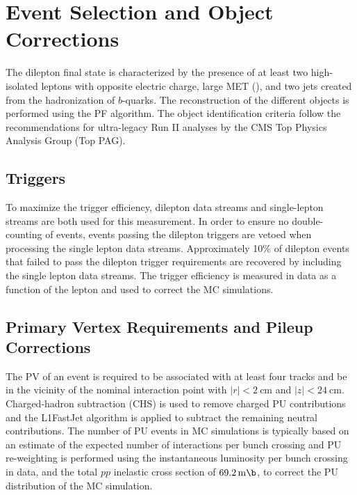 \section{Event Selection and Object Corrections}
The \ttbar dilepton final state is characterized by the presence of at least two high-\pT isolated leptons with opposite electric charge, large MET (\ETmiss), and two jets created from the hadronization of $b$-quarks.
The reconstruction of the different objects is performed using the PF algorithm.
The object identification criteria follow the recommendations for ultra-legacy Run II analyses by the CMS Top Physics Analysis Group (Top PAG).

\subsection{Triggers}
To maximize the trigger efficiency, dilepton data streams and single-lepton streams are both used for this measurement.
In order to ensure no double-counting of events, events passing the dilepton triggers are vetoed when processing the single lepton data streams.
Approximately 10\% of dilepton events that failed to pass the dilepton trigger requirements are recovered by including the single lepton data streams.
The trigger efficiency is measured in data as a function of the lepton \pT and used to correct the MC simulations.

\subsection{Primary Vertex Requirements and Pileup Corrections}
The PV of an event is required to be associated with at least four tracks and be in the vicinity of the nominal interaction point with $\vert r \vert < \SI{2}{\cm}$ and $\vert z \vert < \SI{24}{\cm}$. 
Charged-hadron subtraction (CHS) is used to remove charged PU contributions and the L1FastJet algorithm is applied to subtract the remaining neutral contributions.
The number of PU events in MC simulations is typically based on an estimate of the expected number of interactions per bunch crossing and PU re-weighting is performed using the instantaneous luminosity per bunch crossing in data, and the total $pp$ inelastic cross section of $\SI{69.2}{\milli \b}$, to correct the PU distribution of the MC simulation.

